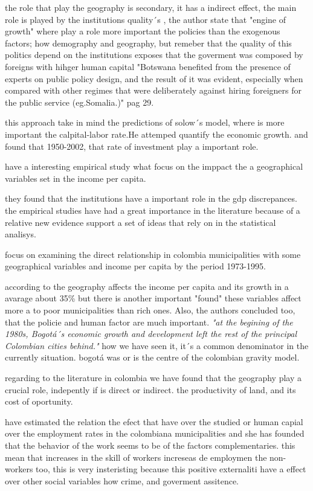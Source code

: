 \documentclass[12pt,letterpaper]{report}
\begin{document}

the role that play the geography is secondary, it has a indirect effect, the main role is played by the institutions quality´s \cite{clavijo}, the author state that "engine of growth" where play a role more important the policies than the exogenous factors; how demography and geography, but remeber that the quality of this politics depend on the institutions \cite{rodriguez} exposes that the goverment was composed by foreigns with hihger human capital "Botswana benefited from the presence of experts on public policy design, and the result of it was evident, especially when compared with other regimes that were deliberately against hiring foreigners for the public service (eg.Somalia.)"  pag 29.

this approach take  in mind the predictions of solow´s model, where is more important the calpital-labor rate.He attemped quantify the economic growth. and found that 1950-2002, that rate of investment play a important role.

\cite{mendoza} have a interesting empirical study what focus on the imppact the a geographical variables set in the income per capita.

they found that the institutions have a important role in the gdp discrepances. the empirical studies have had a great importance in the literature because of a relative new evidence support a set of ideas that rely  on in the statistical analisys. 

\cite{sanchez}  focus on examining the direct relationship in colombia municipalities with some geographical variables and income per capita by the period 1973-1995.

according to \cite{sanchez} the geography affects the income per capita and its growth in a avarage about 35\% but there is another important "found" these variables affect more a to poor municipalities than rich ones. Also, the authors concluded too, that the policie and human factor are  much important. \textit{ "at the begining of the 1980s, Bogotá´s economic growth and  development left the rest of the principal Colombian cities behind."} how we have seen it, it´s a common denominator in the currently situation. bogotá was or is the centre of the colombian gravity model.


regarding to the literature in colombia we have found that the geography play  a crucial role, indepently if is direct or indirect. the productivity of land, and its cost of oportunity.




\cite{diaz} have estimated  the relation the efect that have over the studied or human capial over the employment rates in the colombiana municipalities and she has founded that the behavior of the work seems to be of the factors complementaries. this mean that increases in the skill of workers increseas de employmen the non-workers too, this is very insteristing because this positive externaliti  have a effect over other social variables how crime, and goverment assitence.










\end{document}
